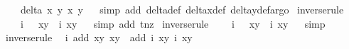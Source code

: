 \begin{isabellebody}
\ \ \ {\isacharminus}\ delta{\isacharprime}\ x{}\ y{}\ x{}\ y{}{\isachardoublequoteclose}\isanewline
%
\isadelimproof
\ \ %
\endisadelimproof
%
\isatagproof
{}\isamarkupfalse%
{\isacharparenleft}simp\ add{\isacharcolon}\ delta{\isacharprime}{\isacharunderscore}def\ delta{\isacharunderscore}x{\isacharunderscore}def\ delta{\isacharunderscore}y{\isacharunderscore}def{\isacharcomma}argo{\isacharparenright}%
\endisatagproof
{\isafoldproof}%
%
\isadelimproof
\isanewline
%
\endisadelimproof
\isanewline
{}\isamarkupfalse%
\ inverse{\isacharunderscore}rule{\isacharunderscore}{}{\isacharcolon}\isanewline
\ \ {\isachardoublequoteopen}{\isacharparenleft}{\isasymtau}\ {\isasymcirc}\ i\ {\isasymcirc}\ {\isasymtau}{\isacharparenright}\ {\isacharparenleft}x{\isacharcomma}y{\isacharparenright}\ {\isacharequal}\ i\ {\isacharparenleft}x{\isacharcomma}y{\isacharparenright}{\isachardoublequoteclose}%
\isadelimproof
\ %
\endisadelimproof
%
\isatagproof
{}\isamarkupfalse%
\ {\isacharparenleft}simp\ add{\isacharcolon}\ t{\isacharunderscore}nz{\isacharparenright}%
\endisatagproof
{\isafoldproof}%
%
\isadelimproof
%
\endisadelimproof
\isanewline
{}\isamarkupfalse%
\ inverse{\isacharunderscore}rule{\isacharunderscore}{}{\isacharcolon}\isanewline
\ \ {\isachardoublequoteopen}{\isacharparenleft}{\isasymrho}\ {\isasymcirc}\ i\ {\isasymcirc}\ {\isasymrho}{\isacharparenright}\ {\isacharparenleft}x{\isacharcomma}y{\isacharparenright}\ {\isacharequal}\ i\ {\isacharparenleft}x{\isacharcomma}y{\isacharparenright}{\isachardoublequoteclose}%
\isadelimproof
\ %
\endisadelimproof
%
\isatagproof
{}\isamarkupfalse%
\ simp%
\endisatagproof
{\isafoldproof}%
%
\isadelimproof
%
\endisadelimproof
\isanewline
{}\isamarkupfalse%
\ inverse{\isacharunderscore}rule{\isacharunderscore}{}{\isacharcolon}\isanewline
\ \ {\isachardoublequoteopen}i\ {\isacharparenleft}add\ {\isacharparenleft}x{}{\isacharcomma}y{}{\isacharparenright}\ {\isacharparenleft}x{}{\isacharcomma}y{}{\isacharparenright}{\isacharparenright}\ {\isacharequal}\ add\ {\isacharparenleft}i\ {\isacharparenleft}x{}{\isacharcomma}y{}{\isacharparenright}{\isacharparenright}\ {\isacharparenleft}i\ {\isacharparenleft}x{}{\isacharcomma}y{}{\isacharparenright}{\isacharparenright}{\isachardoublequoteclose}\isanewline
%
\isadelimproof
\ \ %
\endisadelimproof
%
\isatagproof
{}\isamarkupfalse%

\end{isabellebody}

